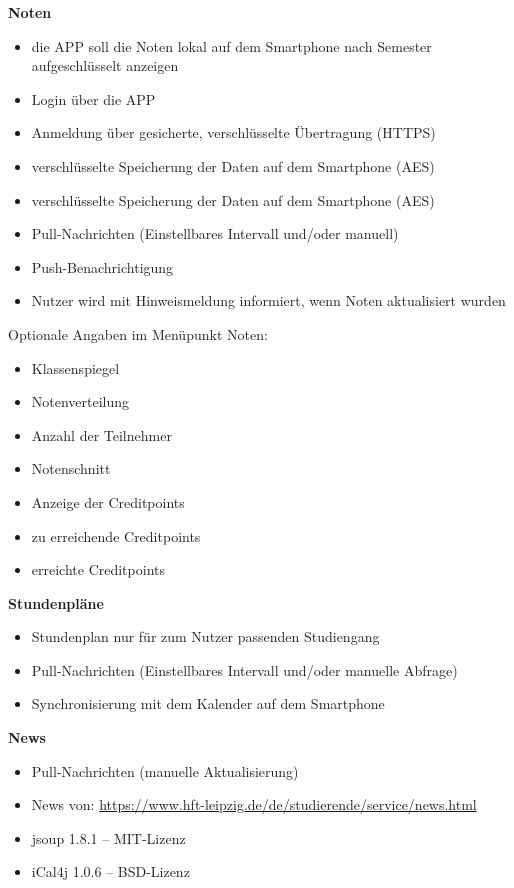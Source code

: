 \textbf{Noten}
\begin{itemize}
	\item die APP soll die Noten lokal auf dem Smartphone nach Semester aufgeschlüsselt anzeigen
	\item Login über die APP
	\item Anmeldung über gesicherte, verschlüsselte Übertragung (\acs{HTTPS})
	\item verschlüsselte Speicherung der Daten auf dem Smartphone (\acs{AES})
	\item verschlüsselte Speicherung der Daten auf dem Smartphone (\acs{AES})
	\item Pull-Nachrichten (Einstellbares Intervall und/oder manuell)
	\item Push-Benachrichtigung
	\item Nutzer wird mit Hinweismeldung informiert, wenn Noten aktualisiert wurden
\end{itemize}
Optionale Angaben im Menüpunkt Noten:
\begin{itemize}
	\item Klassenspiegel
	\item Notenverteilung
	\item Anzahl der Teilnehmer
	\item Notenschnitt
	\item Anzeige der Creditpoints
	\item zu erreichende Creditpoints
	\item erreichte Creditpoints
\end{itemize}
\textbf{Stundenpläne}
\begin{itemize}
	\item Stundenplan nur für zum Nutzer passenden Studiengang
	\item Pull-Nachrichten (Einstellbares Intervall und/oder manuelle Abfrage)
	\item Synchronisierung mit dem Kalender auf dem Smartphone	
\end{itemize}
\textbf{News}
\begin{itemize}
	\item Pull-Nachrichten (manuelle Aktualisierung)
	\item News von: \url{https://www.hft-leipzig.de/de/studierende/service/news.html}
\end{itemize}



\begin{itemize}
	\item jsoup 1.8.1 – MIT-Lizenz
	\item iCal4j 1.0.6 – BSD-Lizenz 
\end{itemize}


